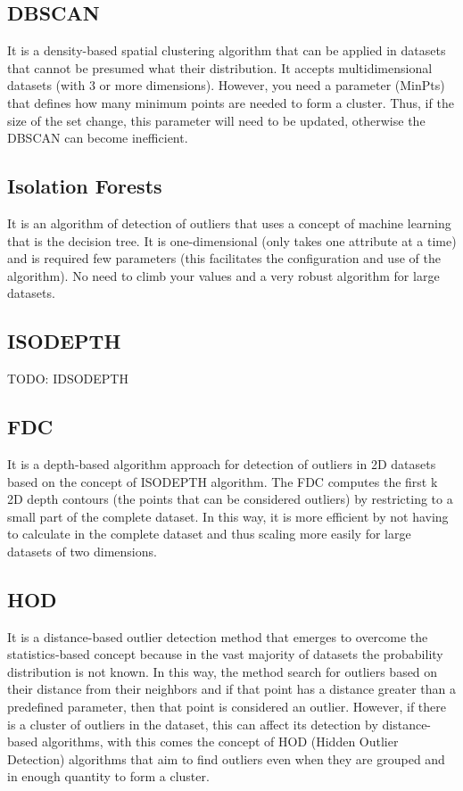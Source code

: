 \subsection{DBSCAN}

It is a density-based spatial clustering algorithm that can be applied in datasets that
cannot be presumed what their distribution. It accepts multidimensional datasets (with
3 or more dimensions). However, you need a parameter (MinPts) that defines how many
minimum points are needed to form a cluster. Thus, if the size of the set change, this
parameter will need to be updated, otherwise the DBSCAN can become inefficient.

\subsection{Isolation Forests}

It is an algorithm of detection of outliers that uses a concept of machine learning that
is the decision tree. It is one-dimensional (only takes one attribute at a time) and is
required few parameters (this facilitates the configuration and use of the algorithm).
No need to climb your values and a very robust algorithm for large datasets.

\subsection{ISODEPTH}

TODO: IDSODEPTH

\subsection{FDC}

It is a depth-based algorithm approach for detection of outliers in 2D datasets based on
the concept of ISODEPTH algorithm. The FDC computes the first k 2D depth contours (the
points that can be considered outliers) by restricting to a small part of the complete
dataset. In this way, it is more efficient by not having to calculate in the complete
dataset and thus scaling more easily for large datasets of two dimensions.

\subsection{HOD}

It is a distance-based outlier detection method that emerges to overcome the statistics-based
concept because in the vast majority of datasets the probability distribution is not known.
In this way, the method search for outliers based on their distance from their neighbors
and if that point has a distance greater than a predefined parameter, then that point is
considered an outlier. However, if there is a cluster of outliers in the dataset, this
can affect its detection by distance-based algorithms, with this comes the concept of HOD
(Hidden Outlier Detection) algorithms that aim to find outliers even when they are grouped
and in enough quantity to form a cluster.

